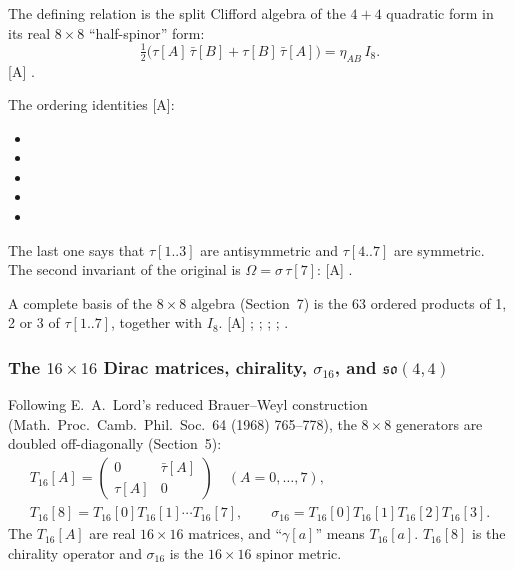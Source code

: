 The defining relation is the split Clifford algebra of the $4+4$ quadratic form in its real
$8\times8$ ``half-spinor'' form:
\begin{equation}
  \tfrac12\bigl(\tau[A]\,\bar\tau[B] + \tau[B]\,\bar\tau[A]\bigr) = \eta_{AB}\,I_8 .
\end{equation}
[A] .

The ordering identities [A]:
\begin{itemize}
  \item {}
  \item {}
  \item {}
  \item {}
  \item {}
\end{itemize}
The last one says that $\tau[1..3]$ are antisymmetric and $\tau[4..7]$ are symmetric. The second
invariant of the original is $\Omega=\sigma\,\tau[7]$: [A] .

A complete basis of the $8\times8$ algebra (Section~7) is the 63 ordered products of 1, 2 or 3 of
$\tau[1..7]$, together with $I_8$. [A] ;
; ;
;
.

\subsubsection{The \texorpdfstring{$16\times16$}{16x16} Dirac matrices, chirality, \texorpdfstring{$\sigma_{16}$}{sigma16}, and \texorpdfstring{$\mathfrak{so}(4,4)$}{so(4,4)}}
\label{fnd:T16}\label{sec:3.1.5}

Following E.~A.~Lord's reduced Brauer--Weyl construction (Math.\ Proc.\ Camb.\ Phil.\ Soc.\ 64
(1968) 765--778), the $8\times8$ generators are doubled off-diagonally (Section~5):
\begin{gather}
  T_{16}[A] = \begin{pmatrix} 0 & \bar\tau[A]\\ \tau[A] & 0\end{pmatrix}\quad (A=0,\dots,7),\\
  T_{16}[8] = T_{16}[0]T_{16}[1]\cdots T_{16}[7],\qquad
  \sigma_{16} = T_{16}[0]T_{16}[1]T_{16}[2]T_{16}[3].
\end{gather}
The $T_{16}[A]$ are real $16\times16$ matrices, and ``$\gamma[a]$'' means $T_{16}[a]$. $T_{16}[8]$
is the chirality operator and $\sigma_{16}$ is the $16\times16$ spinor metric.

